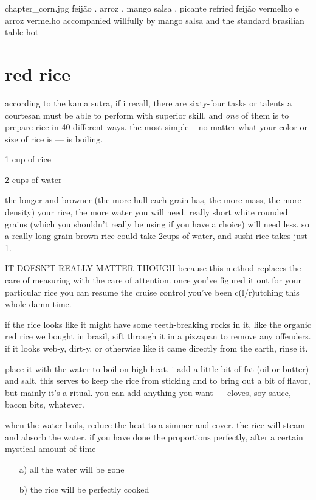 \mychapter
{chapter_corn.jpg}
{feij\~{a}o . arroz . mango salsa . picante}
{refried feij\~{a}o vermelho e arroz vermelho accompanied willfully by
mango salsa and the standard brasilian table hot}

\section{red rice}

according to the kama sutra, if i recall, there are sixty-four tasks
or talents a courtesan must be able to perform with superior skill,
and \textit{one} of them is to prepare rice in 40 different ways. the
most simple -- no matter what your color or size of rice is --- is
boiling.

\begin{ingredients}
  \item 1 cup of rice
  \item 2 cups of water
\end{ingredients}

the longer and browner (the more hull each grain has, the more mass,
the more density) your rice, the more water you will need. really
short white rounded grains (which you shouldn't really be using if you
have a choice) will need less. so a really long grain brown rice could
take 2\onehalf cups of water, and sushi rice takes just 1\onehalf.

IT DOESN'T REALLY MATTER THOUGH because this method replaces the care
of measuring with the care of attention. once you've figured it out
for your particular rice you can resume the cruise control you've been
c(l/r)utching this whole damn time.

if the rice looks like it might have some teeth-breaking rocks in it,
like the organic red rice we bought in brasil, sift through it in a
pizzapan to remove any offenders. if it looks web-y, dirt-y, or
otherwise like it came directly from the earth, rinse it.

place it with the water to boil on high heat. i add a little bit of
fat (oil or butter) and salt. this serves to keep the rice from
sticking and to bring out a bit of flavor, but mainly it's a
ritual. you can add anything you want --- cloves, soy sauce, bacon
bits, whatever.

when the water boils, reduce the heat to a simmer and cover. the rice
will steam and absorb the water. if you have done the proportions
perfectly, after a certain mystical amount of time

\begin{enumerate}
  \item[a)] all the water will be gone 

  \item[b)] the rice will be perfectly cooked
\end{enumerate}


